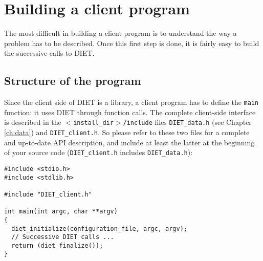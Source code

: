 
\chapter{Building a client program}
\label{ch:client}

The most difficult in building a client program is to understand the way a
problem has to be described. Once this first step is done, it is fairly easy to
build the successive calls to DIET.


\section{Structure of the program}
\label{sec:cl_struct}

Since the client side of DIET is a library, a client program has to define the
\texttt{main} function: it uses DIET through function calls. The complete
client-side interface is described in the \texttt{$<$install\_dir$>$/include}
files \texttt{DIET\_data.h} (see Chapter \ref{ch:data}) and
\texttt{DIET\_client.h}. So please refer to these two files for a complete and
up-to-date API description, and include at least the latter at the beginning of
your source code (\texttt{DIET\_client.h} includes \texttt{DIET\_data.h}):
{\footnotesize
\begin{verbatim}
#include <stdio.h>
#include <stdlib.h>

#include "DIET_client.h"

int main(int argc, char **argv)
{
  diet_initialize(configuration_file, argc, argv);
  // Successive DIET calls ...
  return (diet_finalize());
}
\end{verbatim}
}

